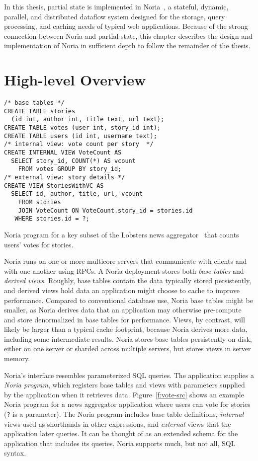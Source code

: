 In this thesis, partial state is implemented in Noria~\cite{noria}, a stateful,
dynamic, parallel, and distributed dataflow system designed for the storage,
query processing, and caching needs of typical web applications. Because of the
strong connection between Noria and partial state, this chapter describes the
design and implementation of Noria in sufficient depth to follow the remainder
of the thesis.

\section{High-level Overview}

\begin{listing}[h]
  \begin{verbatim}
/* base tables */
CREATE TABLE stories
  (id int, author int, title text, url text);
CREATE TABLE votes (user int, story_id int);
CREATE TABLE users (id int, username text);
/* internal view: vote count per story  */
CREATE INTERNAL VIEW VoteCount AS
  SELECT story_id, COUNT(*) AS vcount
    FROM votes GROUP BY story_id;
/* external view: story details */
CREATE VIEW StoriesWithVC AS
  SELECT id, author, title, url, vcount
    FROM stories
    JOIN VoteCount ON VoteCount.story_id = stories.id
   WHERE stories.id = ?;
  \end{verbatim}
  \caption{Noria program for a key subset of the Lobsters news
           aggregator~\cite{lobsters} that counts users' votes for stories.}
  \label{f:vote-src}
\end{listing}

Noria runs on one or more multicore servers that communicate with clients and
with one another using RPCs. A Noria deployment stores both \emph{base tables}
and \emph{derived views}. Roughly, base tables contain the data typically stored
persistently, and derived views hold data an application might choose to cache
to improve performance. Compared to conventional database use, Noria base tables
might be smaller, as Noria derives data that an application may otherwise
pre-compute and store denormalized in base tables for performance. Views, by
contrast, will likely be larger than a typical cache footprint, because Noria
derives more data, including some intermediate results. Noria stores base tables
persistently on disk, either on one server or sharded across multiple servers,
but stores views in server memory.

Noria's interface resembles parameterized SQL queries. The application supplies
a \emph{Noria program}, which registers base tables and views with parameters
supplied by the application when it retrieves data. Figure~\ref{f:vote-src}
shows an example Noria program for a news aggregator application where users can
vote for stories (\texttt{?} is a parameter). The Noria program includes base
table definitions, \emph{internal} views used as shorthands in other
expressions, and \emph{external} views that the application later queries. It
can be thought of as an extended schema for the application that includes its
queries. Noria supports much, but not all, SQL syntax.

